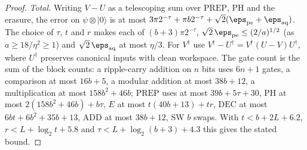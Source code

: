 \begin{proof}
\emph{Total.} Writing $V - U$ as a telescoping sum over $\mathrm{PREP}$, $\mathrm{PH}$ and the erasure, the error on $\psi\otimes|0\rangle$ is at most $3\pi2^{-\tau} + \pi b2^{-\tau} + \sqrt2(\eps_{\mathrm{pe}} + \eps_{\mathrm{aq}})$. The choice of $\tau$, $t$ and $r$ makes each of $(b+3)\pi2^{-\tau}$, $\sqrt2\,\eps_{\mathrm{pe}} \le (2/a)^{1/2}$ (as $a \ge 18/\eta^2 \ge 1$) and $\sqrt2\,\eps_{\mathrm{aq}}$ at most $\eta/3$. For $V^\dagger$ use $V^\dagger - U^\dagger = V^\dagger(U - V)U^\dagger$, where $U^\dagger$ preserves canonical inputs with clean workspace. The gate count is the sum of the block counts: a ripple-carry addition on $n$ bits uses $6n+1$ gates, a comparison at most $16b+5$, a modular addition at most $38b+12$, a multiplication at most $158b^2+46b$; $\mathrm{PREP}$ uses at most $39b + 5\tau + 30$, $\mathrm{PH}$ at most $2(158b^2+46b) + b\tau$, $E$ at most $t(40b+13) + tr$, $\mathrm{DEC}$ at most $6bt + 6b^2 + 35b + 13$, $\mathrm{ADD}$ at most $38b + 12$, $\mathrm{SW}$ $b$ swaps. With $t < b + 2L + 6.2$, $r < L + \log_2 t + 5.8$ and $\tau < L + \log_2(b+3) + 4.3$ this gives the stated bound.
\end{proof}

